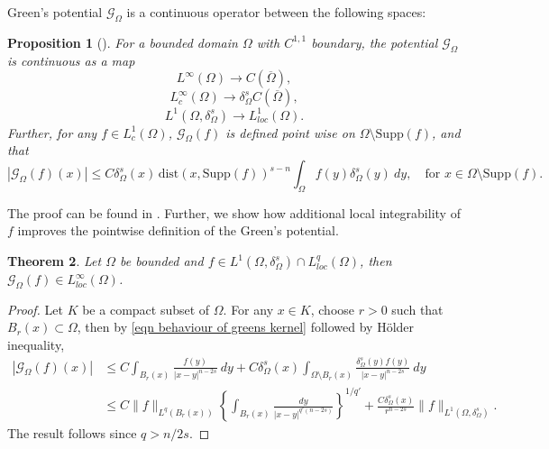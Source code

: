 \documentclass{amsart}
\newtheorem{theorem}{Theorem}[section]
\newtheorem{proposition}[theorem]{Proposition}
\newcommand{\g}[1]{\mathcal{G}_{#1}}
\begin{document}
Green's potential $\g{\Omega}$ is a continuous operator between the following spaces:
\begin{proposition}[\cite{AbatangeloVazquez2023}]
    For a bounded domain $\Omega$ with $C^{1,1}$ boundary, the potential $\g{\Omega}$ is continuous as a map
    \begin{equation}\label{eqn continuity of G 1}
            L^{\infty}(\Omega)\to C(\overline{\Omega}),
            \end{equation}
             \begin{equation}\label{eqn continuity of G 2}
                L^{\infty}_{c}(\Omega)\to \delta_{\Omega}^{s}C(\overline{\Omega}),
            \end{equation}
     \begin{equation}\label{eqn continuity of G 3}
         L^{1}(\Omega,\delta_{\Omega}^{s})\to L_{loc}^{1}(\Omega). 
     \end{equation}
     Further, for any $f\in L_{c}^{1}(\Omega)$, $\g{\Omega}(f)$ is defined point wise on $\Omega\setminus\text{Supp}(f)$, and that
     \begin{equation}\label{bound near the boundary for f compactly supported}
         |\g{\Omega}(f)(x)|\leq C\delta_{\Omega}^{s}(x)\, \text{dist}(x,\text{Supp}(f))^{s-n}\int_{\Omega}f(y)\delta_{\Omega}^{s}(y) \ dy, \quad\text{for } x\in \Omega\setminus\text{Supp}(f).
     \end{equation}
\end{proposition}
The proof can be found in \cite[Theorem 2.1, Theorem 2.10]{AbatangeloVazquez2023}. 
Further, we show how additional local integrability of $f$ improves the pointwise definition of the Green's potential.
\begin{theorem}
    Let $\Omega$ be bounded and $f\in L^{1}(\Omega,\delta_{\Omega}^{s})\cap L^{q}_{loc}(\Omega)$, then $\g{\Omega}(f)\in L^{\infty}_{loc}(\Omega)$.
\end{theorem}
\begin{proof}
    Let $K$ be a compact subset of $\Omega$. For any $x\in K$, choose $r>0$ such that $B_{r}(x)\subset \Omega$, then by \eqref{eqn behaviour of greens kernel} followed by H\"older inequality,
    \begin{equation*}
    \begin{split}
        |\g{\Omega}(f)(x)|&\leq C\int_{B_{r}(x)}\frac{f(y)}{|x-y|^{n-2s}}\ dy+C\delta^{s}_{\Omega}(x)\int_{\Omega\setminus B_{r}(x)} \frac{\delta_{\Omega}^{s}(y)f(y)}{|x-y|^{n-2s}}\ dy\\
        &\leq C \|f\|_{L^{q}(B_{r}(x))}\left\{\int_{B_{r}(x)}\frac{dy}{|x-y|^{q'(n-2s)}}\right\}^{1/q'}+\frac{C\delta^{s}_{\Omega}(x)}{r^{n-2s}}\|f\|_{L^{1}(\Omega, \delta^{s}_{\Omega})}.
    \end{split}
    \end{equation*}
    The result follows since $q>n/2s$.
\end{proof}
\end{document}
